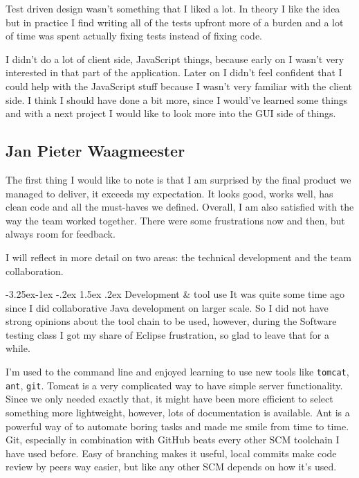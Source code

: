 \documentclass[a4paper]{article}
\makeatletter
\renewcommand\paragraph{\@startsection{paragraph}{4}{\z@}%
  {-3.25ex\@plus -1ex \@minus -.2ex}%
  {1.5ex \@plus .2ex}%
  {\normalfont\normalsize\bfseries}}
\makeatother
\begin{document}
Test driven design wasn't something that I liked a lot. In theory I like the idea but in practice I find writing all of the tests upfront more of a burden and a lot of time was spent actually fixing tests instead of fixing code.

I didn't do a lot of client side, JavaScript things, because early on I wasn't very interested in that part of the application. Later on I didn't feel confident that I could help with the JavaScript stuff because I wasn't very familiar with the client side. I think I should have done a bit more, since I would've learned some things and with a next project I would like to look more into the GUI side of things.

\subsection{Jan Pieter Waagmeester}
The first thing I would like to note is that I am surprised by the final product we managed to deliver, it exceeds my expectation. It looks good, works well, has clean code and all the must-haves we defined. Overall, I am also satisfied with the way the team worked together. There were some frustrations now and then, but always room for feedback. 

I will reflect in more detail on two areas: the technical development and the team collaboration.

\paragraph{Development \& tool use}
It was quite some time ago since I did collaborative Java development on larger scale. So I did not have strong opinions about the tool chain to be used, however, during the Software testing class I got my share of Eclipse frustration, so glad to leave that for a while.

I'm used to the command line and enjoyed learning to use new tools like \verb|tomcat|, \verb|ant|, \verb|git|. Tomcat is a very complicated way to have simple server functionality. Since we only needed exactly that, it might have been more efficient to select something more lightweight, however, lots of documentation is available. Ant is a powerful way of to automate boring tasks and made me smile from time to time. Git, especially in combination with GitHub beats every other SCM toolchain I have used before. Easy of branching makes it useful, local commits make code review by peers way easier, but like any other SCM depends on how it's used.
\end{document}
